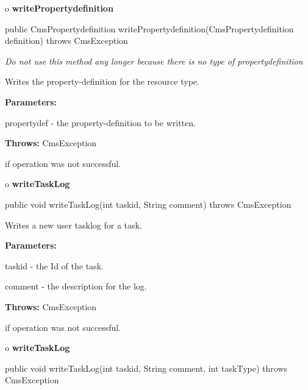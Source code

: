 o {\bf writePropertydefinition}

\begin{PRE}
 public CmsPropertydefinition writePropertydefinition(CmsPropertydefinition definition) throws CmsException
\end{PRE}

\begin{description}
 {\it Do not use
this method any longer because there is no type of propertydefinition}

Writes the property-definition for the resource type.

\begin{description}
\item {\bf Parameters:}

propertydef - the property-definition to be written.
\item {\bf Throws:} CmsException

if operation was not successful.
\end{description}

\end{description}

o {\bf writeTaskLog}

\begin{PRE}
 public void writeTaskLog(int taskid,
                          String comment) throws CmsException
\end{PRE}

\begin{description}
\htmlDD Writes a new user tasklog for a task.

\begin{description}
\item {\bf Parameters:}

taskid - the Id of the task.

comment - the description for the log.
\item {\bf Throws:} CmsException

if operation was not successful.
\end{description}

\end{description}

o {\bf writeTaskLog}

\begin{PRE}
 public void writeTaskLog(int taskid,
                          String comment,
                          int taskType) throws CmsException
\end{PRE}


